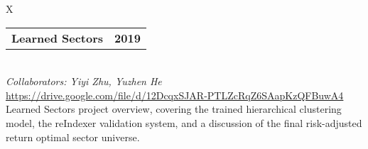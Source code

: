 \documentclass[10pt]{article}
\newcommand{\tabularxwidth}{\textwidth}
\begin{document}
        \begin{minipage}{\tabularxwidth}
        \begin{tabularx}{\tabularxwidth}{X}
            {
                \begin{tabularx}{\tabularxwidth}{@{}X r}
                    \textbf{Learned Sectors} &
                    \textbf{
        2019} \\
                \end{tabularx}
            } \\

            
                \textit{Collaborators: Yiyi Zhu, Yuzhen He} \\
            

            
                \url{https://drive.google.com/file/d/12DcqxSJAR-PTLZcRqZ6SAapKzQFBuwA4} \\
            
            

            
    Learned Sectors project overview, covering the trained hierarchical clustering model, the reIndexer validation system, and a discussion of the final risk-adjusted return optimal sector universe.
        \end{tabularx}
        
            \vspace{.5em}
        

        \end{minipage}
    
\end{document}
